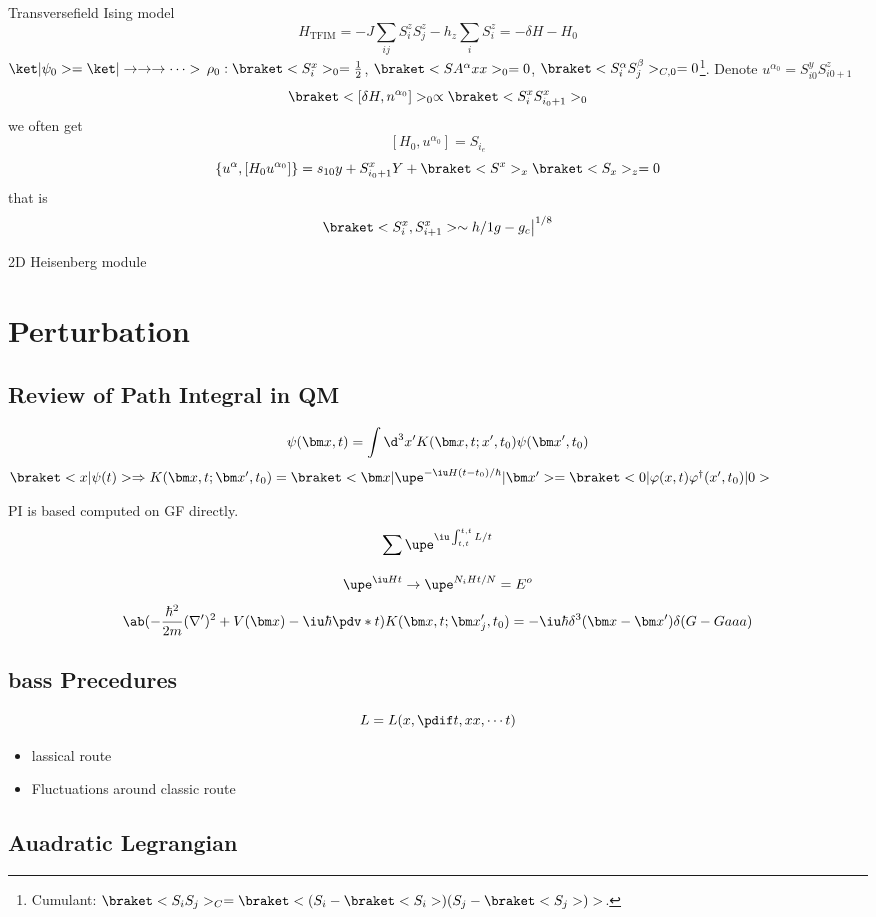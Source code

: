 Transversefield Ising model
\[
  H_\text{TFIM} = -J \sum_{ij} S_i^z S_j^z - h_z \sum_i S_i^z = -\delta H - H_0
\]
$\ket|\psi_0> = \ket|\rightarrow\rightarrow\rightarrow \cdots>$
$\rho_0: \braket<S_i^x>_0 = \frac12$, $\braket<SA^\alpha xx>_0 = 0$,
$\braket<S_i^\alpha S_j^\beta>_{C,0} = 0$\footnote{%
  Cumulant: $\braket<S_iS_j>_C
    = \braket<(S_i - \braket<S_i>)(S_j - \braket<S_j>)>$.%
}.
Denote
$u^{\alpha_0} = S_{i0}^y S_{i0+1}^z$
\[
  \braket<[\delta H, n^{\alpha_0}]>_0 \propto \braket<S_i^x S_{i_0+1}^x>_0
\]
we often get
\[
  [H_0, u^{\alpha_0}] = S_{i_e}
\]
\[
  \{u^\alpha,[H_0 u^{\alpha_0}]\} = s_{10}y + S_{i_0+1}^xY + \braket<S^x>_x
\braket<S_x>_z = 0
\]
that is
\[
  \braket<S_i^x,S_{i+1}^x> \sim h/1 g - g_c\big|^{1/8}
\]

2D Heisenberg module

\section{Perturbation}

\subsection{Review of Path Integral in QM}

\[
  \psi(\bm x,t) = \int \d^3x' K(\bm x,t;x',t_0) \psi(\bm x',t_0)
\]
$\braket<x|\psi(t)> \Rightarrow K(\bm x,t;\bm x',t_0) = \braket<\bm x|\upe^{-\iu H(t-t_0)/\hbar}|\bm x'> = \braket<0|\varphi(x,t) \varphi^\dagger(x',t_0)|0>$

PI is based computed on GF directly.
\[
  \sum_{} \upe^{\iu \int_{t,t}^{t,t} L/t}
\]
\[
  \upe^{\iu Ht} \to \upe^{N_i Ht/N} = E^{o}
\]
\[
  \ab(-\frac{\hbar^2}{2m}(\nabla')^2 + V(\bm x) - \iu\hbar\pdv*{}t)
  K(\bm x,t; \bm x_j',t_0)
  = -\iu\hbar\delta^3(\bm x - \bm x')\delta(G-Gaaa)
\]

\subsection{bass Precedures}

\[
  L = L(x,\pdif t, xx, \cdots t)
\]
\begin{itemize}
  \item lassical route
  \item Fluctuations around classic route
\end{itemize}

\subsection{Auadratic Legrangian}

